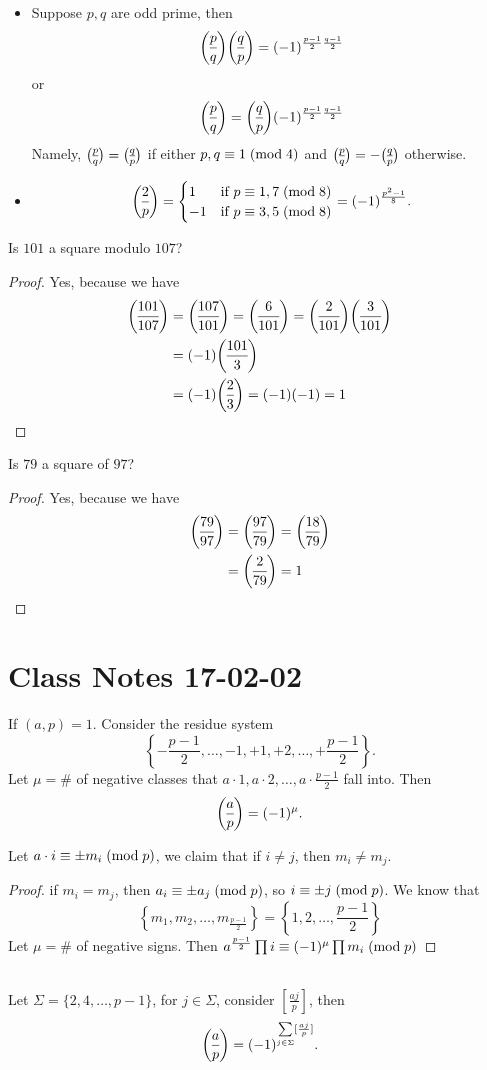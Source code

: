 \documentclass{mynotes}
\begin{document}
\begin{theorem}\mbox{}
	\begin{itemize}
		\item Suppose $p,q$ are odd prime, then $$\leg{p}{q}\leg{q}{p} = (-1)^{\frac{p-1}{2}\frac{q-1}{2}}$$or $$\leg{p}{q} =\leg{q}{p} (-1)^{\frac{p-1}{2}\frac{q-1}{2}}$$
		Namely, $\leg{p}{q} = \leg{q}{p}$ if either $p,q\equiv 1\;(\mbox{mod}{\;4})$ and $\leg{p}{q}=-\leg{q}{p}$ otherwise.
		\item 	\begin{equation*}
		\leg{2}{p}=\begin{cases}
		1 & \text{if $p\con{1,7}{8}$}\\
		-1 & \text{if $p\con{3,5}{8}$}
		\end{cases}=(-1)^{\frac{p^2-1}{8}}.
		\end{equation*}
	\end{itemize}
\end{theorem}
\begin{exercise}
	Is $101$ a square modulo $107$?
\end{exercise}
\begin{proof}
	Yes, because we have
	\begin{align*}
	\leg{101}{107}&=\leg{107}{101}=\leg{6}{101}=\leg{2}{101}\leg{3}{101}\\
	&=(-1)\leg{101}{3}\\
	&=(-1)\leg{2}{3} = (-1)(-1)=1
	\end{align*}
\end{proof}
\begin{exercise}
	Is $79$ a square of $97$?
\end{exercise}
\begin{proof}
	Yes, because we have
	\begin{align*}
	\leg{79}{97}&=\leg{97}{79}=\leg{18}{79}\\
	&=\leg{2}{79} = 1
	\end{align*}
\end{proof}
\section{Class Notes 17-02-02}
\begin{lemma}
	If $(a,p)=1$. Consider the residue system 
	$$\left\{-\frac{p-1}{2},\ldots,-1,+1,+2,\ldots,+\frac{p-1}{2}\right\}.$$ Let $\mu=\#$ of negative classes that $a\cdot1,a\cdot2,\ldots,a\cdot\frac{p-1}{2}$ fall into. Then 
	$$\leg{a}{p}=(-1)^\mu.
	$$
\end{lemma}
Let $a\cdot i \equiv \pm m_i\;(\mbox{mod}{\;p})$, we claim that if $i\ne j$, then $m_i\ne m_j$.
\begin{proof}
	if $m_i=m_j$, then $a_i\equiv \pm a_j\;(\mbox{mod}{\;p})$, so $i\equiv \pm j\;(\mbox{mod}{\;p})$. We know that 
	$$\left\{m_1,m_2,\ldots,m_{\frac{p-1}{2}} \right\}=\left\{1,2,\ldots,\frac{p-1}{2}\right\}$$Let $\mu=\#$ of negative signs. Then $a^{\frac{p-1}{2}}\prod i\equiv (-1)^\mu \prod m_i\;(\mbox{mod}{\;p})$
\end{proof}
\begin{lemma}\mbox{}\\
	Let $\Sigma=\{2,4,\ldots, p-1 \}$, for $j\in\Sigma$, consider $[\frac{aj}{p}]$, then
	$$\leg{a}{p} = (-1)^{\sum\limits_{j\in\Sigma}[\frac{aj}{p}]}.$$
\end{lemma}
\end{document}
